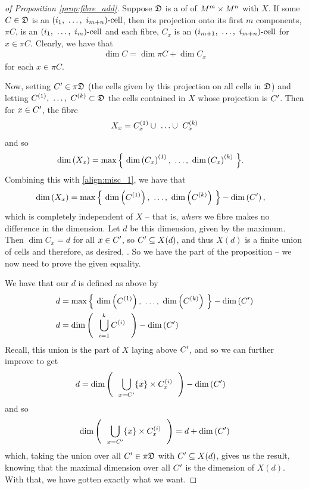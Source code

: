 \begin{proof}[of Proposition \ref{prop:fibre_add}]
  Suppose $\fancyD$ is a \cd of of $\MmMn$ \cmptble with $X$. If some $C \in \fancyD$ is an $\vmcell{i}{m+n}$, then its projection onto its first $m$ components, $\pi C$, is an $\vmcell{i}{m}$ and each fibre, $C_x$ is an $\vmncell{i}{m+1}{m+n}$ for $x \in \pi C$. Clearly, we have that
  \begin{align}
    \label{align:misc_1}
    \dim{C} = \dim{\pi C} + \dim{C_x}
  \end{align}
  for each $x \in \pi C$.

  Now, setting $\pri{C} \in \pi \fancyD$ (the cells given by this projection on all cells in $\fancyD$) and letting $\vmvnsupbr{C}{1}{k} \subset \fancyD$ the cells contained in $X$ whose projection is $\pri{C}$. Then for $x \in \pri{C}$, the fibre
  \begin{align*}
    X_x = \vmvnsupbr[\cup]{C_x}{1}{k}
  \end{align*}
  and so
  \begin{align*}
    \dim{X_x} &= \max{ \left\{ \ \vmvnsupbr{\dim{C_x}}{1}{k} \ \right\} }.
  \end{align*}
  Combining this with \ref{align:misc_1}, we have that
  \begin{align*}
    \dim{X_x} &= \max{ \left\{ \ \dim{C^{(1)}}, \ \hdots, \ \dim{C^{(k)}} \ \right\} } - \dim{\pri{C}} ,
  \end{align*}
  which is completely independent of $X$ -- that is, \emph{where} we fibre makes no difference in the dimension. Let $d$ be this dimension, given by the maximum. Then $\dim{C_x} = d$ for all $x \in \pri{C}$, so $\pri{C} \subseteq X(d)$, and thus $X(d)$ is a finite union of cells and therefore, as desired, . So we have the  part of the proposition -- we now need to prove the given equality.

  We have that our $d$ is defined as above by
  \begin{align*}
    d &= \max{ \left\{ \ \dim{C^{(1)}}, \ \hdots, \ \dim{C^{(k)}} \ \right\} }  - \dim{\pri{C}}  \\
    d &= \dim{ \ \ \bigcup_{i=1}^{k} C^{(i)} \ \ }    - \dim{\pri{C}}  \\
  \end{align*}
  Recall, this union is the part of $X$ laying above $\pri{C}$, and so we can further improve to get
  \begin{align*}
    d &= \dim{ \ \ \bigcup_{x=\pri{C}} \{x\} \times C_x^{(i)} \ \ }  - \dim{\pri{C}}
  \end{align*}
  and so
  \begin{align*}
    \dim{ \ \ \bigcup_{x=\pri{C}} \{x\} \times C_x^{(i)} \ \ } = d + \dim{\pri{C}}
  \end{align*}
  which, taking the union over all $\pri{C} \in \pi \fancyD$ with $\pri{C} \subseteq X(d)$, gives us the result, knowing that the maximal dimension over all $\pri{C}$ is the dimension of $X(d)$. With that, we have gotten exactly what we want.
\end{proof}

